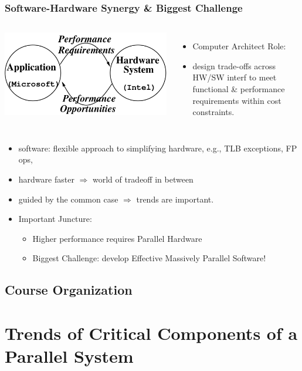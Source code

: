 \documentclass{beamer}
\renewcommand{\emph}[1]{\textcolor{structure}{#1}}
\newcommand{\emp}[1]{\textcolor{DikuRed}{ #1}}
\begin{document}
\begin{frame}[fragile,t]
\frametitle{Software-Hardware Synergy \& Biggest Challenge}
\medskip
\begin{columns}
\includegraphics[width=29ex]{Ch1Figs/Synergy}
\vspace{-3ex}
\begin{itemize}
    \item Computer Architect Role:
    \item \emp{design trade-offs across HW/SW interf to meet functional 
            \& performance requirements within cost constraints.}
\end{itemize}
\end{columns}
\medskip

\begin{itemize}
    \item software: flexible approach to simplifying hardware, 
            e.g., TLB exceptions, FP ops,
    \item hardware faster $\Rightarrow$ world of tradeoff in between 
    \item guided by the common case $\Rightarrow$ trends are important.\bigskip

    \item \emp{Important Juncture:} 
        \begin{itemize}
            \item \emph{Higher performance requires Parallel Hardware}
            \item \alert{Biggest Challenge: 
                    develop Effective Massively Parallel Software!}
        \end  {itemize}
\end{itemize}
\end{frame}


\subsection{Course Organization}



\section{Trends of Critical Components of a Parallel System}
\end{document}
